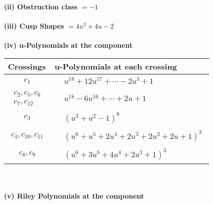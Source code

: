 \documentclass[1p]{elsarticle_modified}
\theoremstyle{definition}
\begin{document}
\flushleft \textbf{(ii) Obstruction class $= -1$}\\~\\
\flushleft \textbf{(iii) Cusp Shapes $= 4 u^3+4 u-2$}\\~\\
\newpage\renewcommand{\arraystretch}{1}
\flushleft \textbf{(iv) u-Polynomials at the component}\newline \\
\begin{tabular}{m{50pt}|m{274pt}}
Crossings & \hspace{64pt}u-Polynomials at each crossing \\
\hline $$\begin{aligned}c_{1}\end{aligned}$$&$\begin{aligned}
&u^{18}+12 u^{17}+\cdots-2 u^3+1
\end{aligned}$\\
\hline $$\begin{aligned}c_{2},c_{5},c_{6}\\c_{7},c_{12}\end{aligned}$$&$\begin{aligned}
&u^{18}-6 u^{16}+\cdots+2 u+1
\end{aligned}$\\
\hline $$\begin{aligned}c_{3}\end{aligned}$$&$\begin{aligned}
&(u^3+u^2-1)^6
\end{aligned}$\\
\hline $$\begin{aligned}c_{4},c_{10},c_{11}\end{aligned}$$&$\begin{aligned}
&(u^6+u^5+2 u^4+2 u^3+2 u^2+2 u+1)^3
\end{aligned}$\\
\hline $$\begin{aligned}c_{8},c_{9}\end{aligned}$$&$\begin{aligned}
&(u^6+3 u^5+4 u^4+2 u^3+1)^3
\end{aligned}$\\
\hline
\end{tabular}\\~\\
\newpage\renewcommand{\arraystretch}{1}
\flushleft \textbf{(v) Riley Polynomials at the component}\newline \\
\end{document}
